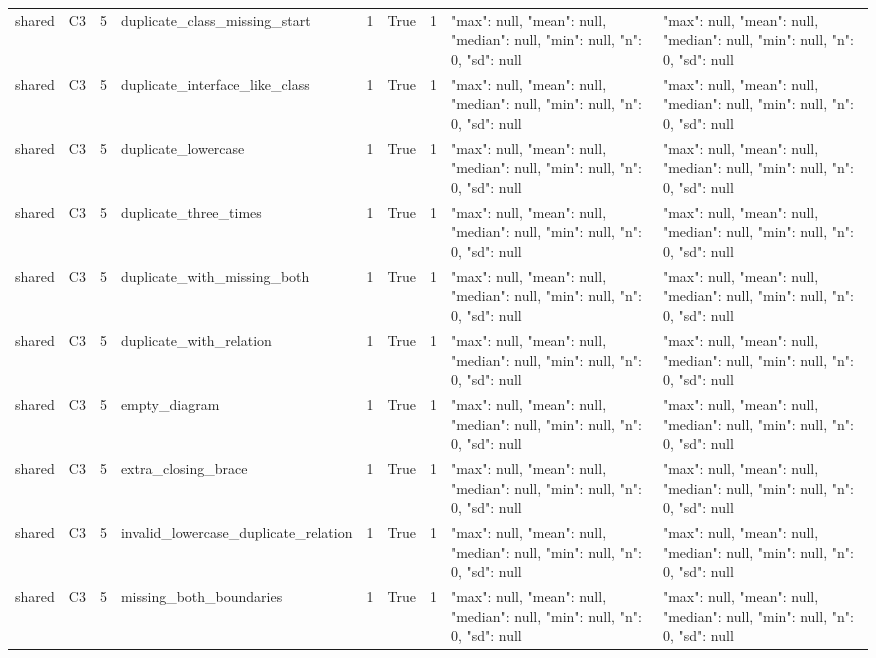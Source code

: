 \begin{tabular}{lllllllll}
shared & C3 & 5 & duplicate\_class\_missing\_start & 1 & True & 1 & {"max": null, "mean": null, "median": null, "min": null, "n": 0, "sd": null} & {"max": null, "mean": null, "median": null, "min": null, "n": 0, "sd": null} \\
shared & C3 & 5 & duplicate\_interface\_like\_class & 1 & True & 1 & {"max": null, "mean": null, "median": null, "min": null, "n": 0, "sd": null} & {"max": null, "mean": null, "median": null, "min": null, "n": 0, "sd": null} \\
shared & C3 & 5 & duplicate\_lowercase & 1 & True & 1 & {"max": null, "mean": null, "median": null, "min": null, "n": 0, "sd": null} & {"max": null, "mean": null, "median": null, "min": null, "n": 0, "sd": null} \\
shared & C3 & 5 & duplicate\_three\_times & 1 & True & 1 & {"max": null, "mean": null, "median": null, "min": null, "n": 0, "sd": null} & {"max": null, "mean": null, "median": null, "min": null, "n": 0, "sd": null} \\
shared & C3 & 5 & duplicate\_with\_missing\_both & 1 & True & 1 & {"max": null, "mean": null, "median": null, "min": null, "n": 0, "sd": null} & {"max": null, "mean": null, "median": null, "min": null, "n": 0, "sd": null} \\
shared & C3 & 5 & duplicate\_with\_relation & 1 & True & 1 & {"max": null, "mean": null, "median": null, "min": null, "n": 0, "sd": null} & {"max": null, "mean": null, "median": null, "min": null, "n": 0, "sd": null} \\
shared & C3 & 5 & empty\_diagram & 1 & True & 1 & {"max": null, "mean": null, "median": null, "min": null, "n": 0, "sd": null} & {"max": null, "mean": null, "median": null, "min": null, "n": 0, "sd": null} \\
shared & C3 & 5 & extra\_closing\_brace & 1 & True & 1 & {"max": null, "mean": null, "median": null, "min": null, "n": 0, "sd": null} & {"max": null, "mean": null, "median": null, "min": null, "n": 0, "sd": null} \\
shared & C3 & 5 & invalid\_lowercase\_duplicate\_relation & 1 & True & 1 & {"max": null, "mean": null, "median": null, "min": null, "n": 0, "sd": null} & {"max": null, "mean": null, "median": null, "min": null, "n": 0, "sd": null} \\
shared & C3 & 5 & missing\_both\_boundaries & 1 & True & 1 & {"max": null, "mean": null, "median": null, "min": null, "n": 0, "sd": null} & {"max": null, "mean": null, "median": null, "min": null, "n": 0, "sd": null} \\

\end{tabular}
